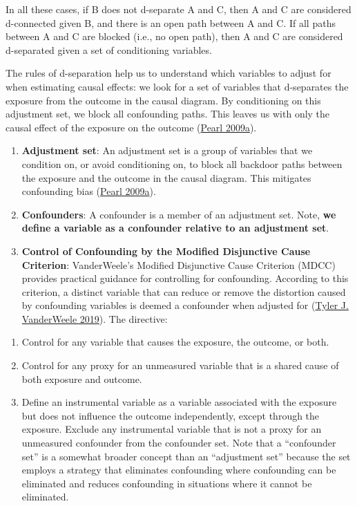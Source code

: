 \documentclass[
  singlecolumn]{article}
\providecommand{\tightlist}{%
  \setlength{\itemsep}{0pt}\setlength{\parskip}{0pt}}\usepackage{longtable,booktabs,array}
\begin{document}
In all these cases, if B does not d-separate A and C, then A and C are
considered d-connected given B, and there is an open path between A and
C. If all paths between A and C are blocked (i.e., no open path), then A
and C are considered d-separated given a set of conditioning variables.

The rules of d-separation help us to understand which variables to
adjust for when estimating causal effects: we look for a set of
variables that d-separates the exposure from the outcome in the causal
diagram. By conditioning on this adjustment set, we block all
confounding paths. This leaves us with only the causal effect of the
exposure on the outcome (\protect\hyperlink{ref-pearl2009}{Pearl
2009a}).

\begin{enumerate}
\def\labelenumi{\arabic{enumi}.}
\setcounter{enumi}{4}
\item
  \textbf{Adjustment set}: An adjustment set is a group of variables
  that we condition on, or avoid conditioning on, to block all backdoor
  paths between the exposure and the outcome in the causal diagram. This
  mitigates confounding bias (\protect\hyperlink{ref-pearl2009}{Pearl
  2009a}).
\item
  \textbf{Confounders}: A confounder is a member of an adjustment set.
  Note, \textbf{we define a variable as a confounder relative to an
  adjustment set}.
\item
  \textbf{Control of Confounding by the Modified Disjunctive Cause
  Criterion}: VanderWeele's Modified Disjunctive Cause Criterion (MDCC)
  provides practical guidance for controlling for confounding. According
  to this criterion, a distinct variable that can reduce or remove the
  distortion caused by confounding variables is deemed a confounder when
  adjusted for (\protect\hyperlink{ref-vanderweele2019}{Tyler J.
  VanderWeele 2019}). The directive:
\end{enumerate}

\begin{enumerate}
\def\labelenumi{\alph{enumi}.}
\tightlist
\item
  Control for any variable that causes the exposure, the outcome, or
  both.
\item
  Control for any proxy for an unmeasured variable that is a shared
  cause of both exposure and outcome.
\item
  Define an instrumental variable as a variable associated with the
  exposure but does not influence the outcome independently, except
  through the exposure. Exclude any instrumental variable that is not a
  proxy for an unmeasured confounder from the confounder set. Note that
  a ``confounder set'' is a somewhat broader concept than an
  ``adjustment set'' because the set employs a strategy that eliminates
  confounding where confounding can be eliminated and reduces
  confounding in situations where it cannot be eliminated.
\end{enumerate}
\end{document}
